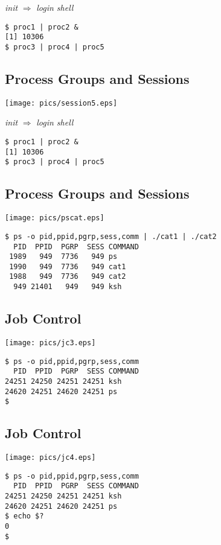 \documentclass[xga]{xdvislides}
\begin{document}
{\em init} $\Rightarrow$ {\em login shell}
\begin{verbatim}
$ proc1 | proc2 &
[1] 10306
$ proc3 | proc4 | proc5

\end{verbatim}

\subsection{Process Groups and Sessions}
\begin{center}
	\texttt{[image: pics/session5.eps]}
\end{center}

{\em init} $\Rightarrow$ {\em login shell}
\begin{verbatim}
$ proc1 | proc2 &
[1] 10306
$ proc3 | proc4 | proc5
\end{verbatim}


\subsection{Process Groups and Sessions}
\begin{center}
	\texttt{[image: pics/pscat.eps]}
\end{center}
\begin{verbatim}
$ ps -o pid,ppid,pgrp,sess,comm | ./cat1 | ./cat2
  PID  PPID  PGRP  SESS COMMAND
 1989   949  7736   949 ps
 1990   949  7736   949 cat1
 1988   949  7736   949 cat2
  949 21401   949   949 ksh
\end{verbatim}


\subsection{Job Control}
\begin{center}
	\texttt{[image: pics/jc3.eps]}
\end{center}
\addvspace{.5in}
\begin{verbatim}
$ ps -o pid,ppid,pgrp,sess,comm
  PID  PPID  PGRP  SESS COMMAND
24251 24250 24251 24251 ksh
24620 24251 24620 24251 ps
$
\end{verbatim}

\subsection{Job Control}
\begin{center}
	\texttt{[image: pics/jc4.eps]}
\end{center}
\addvspace{.5in}
\begin{verbatim}
$ ps -o pid,ppid,pgrp,sess,comm
  PID  PPID  PGRP  SESS COMMAND
24251 24250 24251 24251 ksh
24620 24251 24620 24251 ps
$ echo $?
0
$
\end{verbatim}
\end{document}

